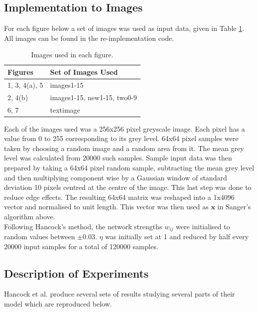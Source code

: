 \subsection{Implementation to Images}

For each figure below a set of images was used as input data, given in Table \ref{tab:Table 1}. All images can be found in the re-implementation code. 
\begin{table}[h]
    \centering
    \begin{tabular}{ll}
    \hline
    Figures&Set of Images Used\\
    \hline
    1, 3, 4(a), 5&images1-15\\
    2, 4(b)&images1-15, new1-15, two0-9\\
    6, 7&textimage\\
    \hline
    \end{tabular}
    \caption{Images used in each figure.}
    \label{tab:Table 1}
\end{table}
Each of the images used was a 256x256 pixel greyscale image. Each pixel has a value from 0 to 255 corresponding to its grey level. 64x64 pixel samples were taken by choosing a random image and a random area from it. The mean grey level was calculated from 20000 such samples. Sample input data was then prepared by taking a 64x64 pixel random sample, subtracting the mean grey level and then multiplying component wise by a Gaussian window of standard deviation 10 pixels centred at the centre of the image. This last step was done to reduce edge effects. The resulting 64x64 matrix was reshaped into a 1x4096 vector and normalised to unit length. This vector was then used as $\textbf{x}$ in Sanger's algorithm above.\\
Following Hancock's method, the network strengths $w_{ij}$ were initialised to random values between $\pm 0.03$. $\eta$ was initially set at 1 and reduced by half every 20000 input samples for a total of 120000 samples.

\subsection{Description of Experiments}
Hancock et al. produce several sets of results studying several parts of their model which are reproduced below.

